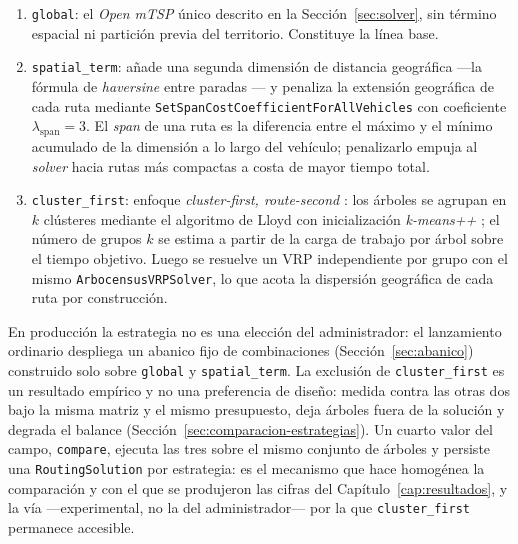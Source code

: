 \begin{enumerate}
  \item \texttt{global}: el \textit{Open mTSP} único descrito en la Sección~\ref{sec:solver}, sin
        término espacial ni partición previa del territorio. Constituye la línea base.
  \item \texttt{spatial\_term}: añade una segunda dimensión de distancia geográfica ---la fórmula de
        \textit{haversine} entre paradas \citep{sinnott1984virtues}--- y penaliza la extensión
        geográfica de cada ruta mediante \texttt{SetSpanCostCoefficientForAllVehicles} con
        coeficiente $\lambda_{\text{span}} = 3$. El \textit{span} de una ruta es la diferencia entre
        el máximo y el mínimo acumulado de la dimensión a lo largo del vehículo; penalizarlo empuja
        al \textit{solver} hacia rutas más compactas a costa de mayor tiempo total.
  \item \texttt{cluster\_first}: enfoque \textit{cluster-first, route-second}
        \citep{fisher1981generalized}: los árboles se agrupan en $k$ clústeres mediante el algoritmo
        de Lloyd \citep{lloyd1982least} con inicialización \textit{k-means++}
        \citep{arthur2007kmeans}; el número de grupos $k$ se estima a partir de la carga de trabajo
        por árbol sobre el tiempo objetivo. Luego se resuelve un VRP independiente por grupo con el
        mismo \texttt{ArbocensusVRPSolver}, lo que acota la dispersión geográfica de cada ruta por
        construcción.
\end{enumerate}

En producción la estrategia no es una elección del administrador: el lanzamiento ordinario
despliega un abanico fijo de combinaciones (Sección~\ref{sec:abanico}) construido solo sobre
\texttt{global} y \texttt{spatial\_term}. La exclusión de \texttt{cluster\_first} es un resultado
empírico y no una preferencia de diseño: medida contra las otras dos bajo la misma matriz y el
mismo presupuesto, deja árboles fuera de la solución y degrada el balance
(Sección~\ref{sec:comparacion-estrategias}). Un cuarto valor del campo, \texttt{compare}, ejecuta
las tres sobre el mismo conjunto de árboles y persiste una \texttt{RoutingSolution} por estrategia:
es el mecanismo que hace homogénea la comparación y con el que se produjeron las cifras del
Capítulo~\ref{cap:resultados}, y la vía ---experimental, no la del administrador--- por la que
\texttt{cluster\_first} permanece accesible.

